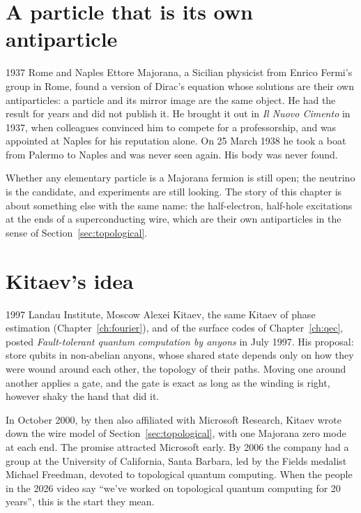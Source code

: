 \section{A particle that is its own antiparticle}

\begin{history}{1937 \textperiodcentered{} Rome and Naples}
Ettore Majorana, a Sicilian physicist from Enrico Fermi's group in Rome, found a
version of Dirac's equation whose solutions are their own antiparticles: a particle
and its mirror image are the same object. He had the result for years and did not
publish it. He brought it out in \emph{Il Nuovo Cimento} in 1937, when colleagues
convinced him to compete for a professorship, and was appointed at Naples for his
reputation alone. On 25 March 1938 he took a boat from Palermo to Naples and was
never seen again. His body was never found.
\end{history}

Whether any elementary particle is a Majorana fermion is still open; the neutrino is
the candidate, and experiments are still looking. The story of this chapter is about
something else with the same name: the half-electron, half-hole excitations at the ends
of a superconducting wire, which are their own antiparticles in the sense of
Section~\ref{sec:topological}.

\section{Kitaev's idea}

\begin{history}{1997 \textperiodcentered{} Landau Institute, Moscow}
Alexei Kitaev, the same Kitaev of phase estimation (Chapter~\ref{ch:fourier}), and of the
surface codes of Chapter~\ref{ch:qec}, posted \emph{Fault-tolerant quantum computation
by anyons} in July 1997. His proposal: store qubits in non-abelian anyons, whose shared
state depends only on how they were wound around each other, the topology of their
paths. Moving one around another applies a gate, and the gate is exact as long as the
winding is right, however shaky the hand that did it.
\end{history}

In October 2000, by then also affiliated with Microsoft Research, Kitaev wrote down the
wire model of Section~\ref{sec:topological}, with one Majorana zero mode at each end. The
promise attracted Microsoft early. By 2006 the company had a group at the University of
California, Santa Barbara, led by the Fields medalist Michael Freedman, devoted to
topological quantum computing. When the people in the 2026 video say ``we've worked on
topological quantum computing for 20 years'', this is the start they mean.

